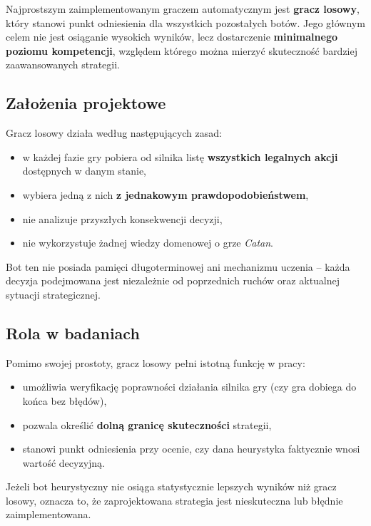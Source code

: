 \documentclass[polish,inz,longabstract]{iithesis}
\begin{document}
Najprostszym zaimplementowanym graczem automatycznym jest \textbf{gracz losowy}, który stanowi punkt odniesienia dla wszystkich pozostałych botów. Jego głównym celem nie jest osiąganie wysokich wyników, lecz dostarczenie \textbf{minimalnego poziomu kompetencji}, względem którego można mierzyć skuteczność bardziej zaawansowanych strategii.

\subsection{Założenia projektowe}

Gracz losowy działa według następujących zasad:

\begin{itemize}
\item w każdej fazie gry pobiera od silnika listę \textbf{wszystkich legalnych akcji} dostępnych w danym stanie,
\item wybiera jedną z nich \textbf{z jednakowym prawdopodobieństwem},
\item nie analizuje przyszłych konsekwencji decyzji,
\item nie wykorzystuje żadnej wiedzy domenowej o grze \textit{Catan}.
\end{itemize}

Bot ten nie posiada pamięci długoterminowej ani mechanizmu uczenia – każda decyzja podejmowana jest niezależnie od poprzednich ruchów oraz aktualnej sytuacji strategicznej.

\subsection{Rola w badaniach}

Pomimo swojej prostoty, gracz losowy pełni istotną funkcję w pracy:

\begin{itemize}
\item umożliwia weryfikację poprawności działania silnika gry (czy gra dobiega do końca bez błędów),
\item pozwala określić \textbf{dolną granicę skuteczności} strategii,
\item stanowi punkt odniesienia przy ocenie, czy dana heurystyka faktycznie wnosi wartość decyzyjną.
\end{itemize}

Jeżeli bot heurystyczny nie osiąga statystycznie lepszych wyników niż gracz losowy, oznacza to, że zaprojektowana strategia jest nieskuteczna lub błędnie zaimplementowana.
\end{document}
